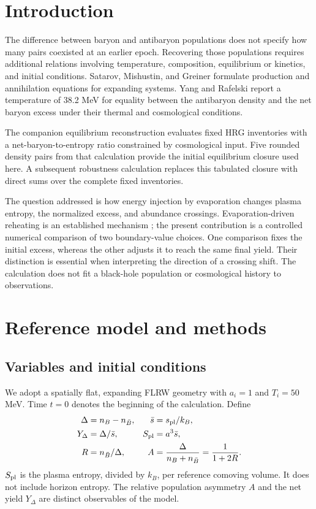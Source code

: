 \documentclass[10pt,a4paper,twocolumn]{article}
\newcommand{\nb}{{n_{\bar B}}}
\newcommand{\Y}{{Y_\Delta}}
\newcommand{\sbar}{\bar s}
\begin{document}

\section{Introduction}
The difference between baryon and antibaryon populations does not specify how many pairs coexisted at an earlier epoch. Recovering those populations requires additional relations involving temperature, composition, equilibrium or kinetics, and initial conditions. Satarov, Mishustin, and Greiner \cite{satarov} formulate production and annihilation equations for expanding systems. Yang and Rafelski \cite{yang} report a temperature of 38.2 MeV for equality between the antibaryon density and the net baryon excess under their thermal and cosmological conditions.

The companion equilibrium reconstruction \cite{garcia} evaluates fixed HRG inventories with a net-baryon-to-entropy ratio constrained by cosmological input. Five rounded density pairs from that calculation provide the initial equilibrium closure used here. A subsequent robustness calculation replaces this tabulated closure with direct sums over the complete fixed inventories.

The question addressed is how energy injection by evaporation changes plasma entropy, the normalized excess, and abundance crossings. Evaporation-driven reheating is an established mechanism \cite{haque}; the present contribution is a controlled numerical comparison of two boundary-value choices. One comparison fixes the initial excess, whereas the other adjusts it to reach the same final yield. Their distinction is essential when interpreting the direction of a crossing shift. The calculation does not fit a black-hole population or cosmological history to observations.

\section{Reference model and methods}
\subsection{Variables and initial conditions}
We adopt a spatially flat, expanding FLRW geometry with $a_i=1$ and $T_i=50$ MeV. Time $t=0$ denotes the beginning of the calculation. Define
\begin{align}
\Delta&=n_B-\nb, & \sbar&=s_{\rm pl}/k_B,\\
\Y&=\Delta/\sbar, & S_{\rm pl}&=a^3\sbar,\\
R&=\nb/\Delta, & A&=\frac{\Delta}{n_B+\nb}=\frac{1}{1+2R}.
\end{align}
$S_{\rm pl}$ is the plasma entropy, divided by $k_B$, per reference comoving volume. It does not include horizon entropy. The relative population asymmetry $A$ and the net yield $\Y$ are distinct observables of the model.
\end{document}
